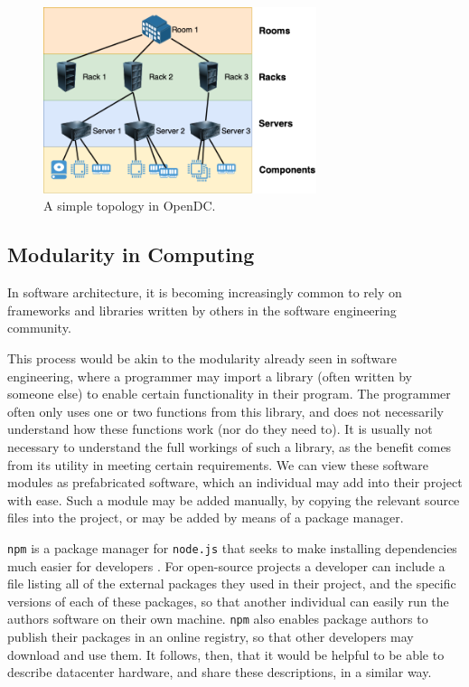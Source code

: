 \documentclass[11pt]{article}
\begin{document}
		\begin{figure}[]
			\centering
			\includegraphics[width=8cm]{opendc-topology.png}
			\caption[A simple topology in OpenDC]{A simple topology in OpenDC.}
			\label{fig:example-opendc-topology}
		\end{figure}
	
	\subsection{Modularity in Computing}
		In software architecture, it is becoming increasingly common to rely on frameworks and libraries written by others in the software engineering community. 

		This process would be akin to the modularity already seen in software engineering, where a programmer may import a library (often written by someone else) to enable certain functionality in their program. 
		The programmer often only uses one or two functions from this library, and does not necessarily understand how these functions work (nor do they need to).
		It is usually not necessary to understand the full workings of such a library, as the benefit comes from its utility in meeting certain requirements. 
		We can view these software modules as prefabricated software, which an individual may add into their project with ease. 
		Such a module may be added manually, by copying the relevant source files into the project, or may be added by means of a package manager.
		
		\verb|npm| is a package manager for \verb|node.js| that seeks to make installing dependencies much easier for developers \cite{Wittern2016}.
		For open-source projects a developer can include a file listing all of the external packages they used in their project, and the specific versions of each of these packages, so that another individual can easily run the authors software on their own machine.
		\verb|npm| also enables package authors to publish their packages in an online registry, so that other developers may download and use them.
		It follows, then, that it would be helpful to be able to describe datacenter hardware, and share these descriptions, in a similar way. 
\end{document}

